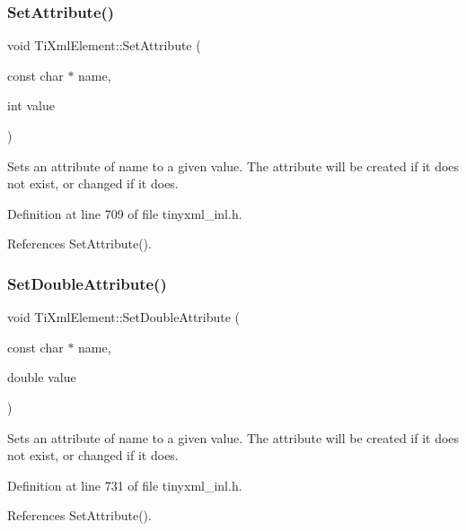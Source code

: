 \hypertarget{class_ti_xml_element_ace6f4be75e373726d4774073d666d1a7}{}\label{class_ti_xml_element_ace6f4be75e373726d4774073d666d1a7} 
\subsubsection{\texorpdfstring{Set\+Attribute()}{SetAttribute()}\hspace{0.1cm}{\footnotesize\ttfamily [4/4]}}
{\footnotesize\ttfamily void Ti\+Xml\+Element\+::\+Set\+Attribute (\begin{DoxyParamCaption}\item[{const char $\ast$}]{name,  }\item[{int}]{value }\end{DoxyParamCaption})}

Sets an attribute of name to a given value. The attribute will be created if it does not exist, or changed if it does. 

Definition at line 709 of file tinyxml\+\_\+inl.\+h.



References Set\+Attribute().

\hypertarget{class_ti_xml_element_a0d1dd975d75496778177e35abfe0ec0b}{}\label{class_ti_xml_element_a0d1dd975d75496778177e35abfe0ec0b} 
\subsubsection{\texorpdfstring{Set\+Double\+Attribute()}{SetDoubleAttribute()}}
{\footnotesize\ttfamily void Ti\+Xml\+Element\+::\+Set\+Double\+Attribute (\begin{DoxyParamCaption}\item[{const char $\ast$}]{name,  }\item[{double}]{value }\end{DoxyParamCaption})}

Sets an attribute of name to a given value. The attribute will be created if it does not exist, or changed if it does. 

Definition at line 731 of file tinyxml\+\_\+inl.\+h.



References Set\+Attribute().

